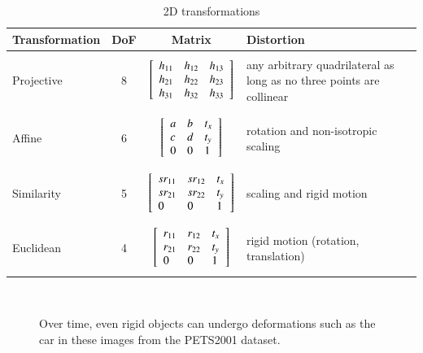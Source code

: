 								\begin{table}[t]
								\centering
								\begin{tabular}{| l | c | c | p{2.5in} |}
								\hline
								Transformation & DoF & Matrix & Distortion\\ \hline 
								& & & \\ Projective & 8 & $\left[ \begin{array}{lll} h_{11} & h_{12} & h_{13} \\ h_{21} & h_{22} & h_{23} \\ h_{31} & h_{32} & h_{33} \\ \end{array} \right]$ & any arbitrary quadrilateral as long as no three points are collinear\\  & & & \\ \hline
								& & & \\ Affine & 6 & $\left[ \begin{array}{lll} a &b & t_x \\ c & d & t_y \\ 0 & 0 & 1 \\ \end{array} \right]$ & rotation and non-isotropic scaling\\  & & & \\ \hline
								& & & \\ Similarity & 5 & $\left[ \begin{array}{lll} sr_{11} & sr_{12} & t_x \\ sr_{21} & sr_{22} & t_y \\ 0 & 0 & 1 \\ \end{array} \right]$ & scaling and rigid motion\\  & & & \\ \hline
								& & & \\ Euclidean & 4 & $\left[ \begin{array}{lll} r_{11} & r_{12} & t_x \\ r_{21} & r_{22} & t_y \\ 0 & 0 & 1 \\ \end{array} \right]$ & rigid motion (rotation, translation) \\  & & & \\ \hline
								\end{tabular}\
								\caption{2D transformations}
								\label{table:2Dtransformations}
								\end{table}

								\begin{figure}[t]
								\centering
								\caption{Over time, even rigid objects can undergo deformations such as the car in these images from the PETS2001 dataset.}
								\label{Fig:PETS2001_deformation}
								\end{figure}

